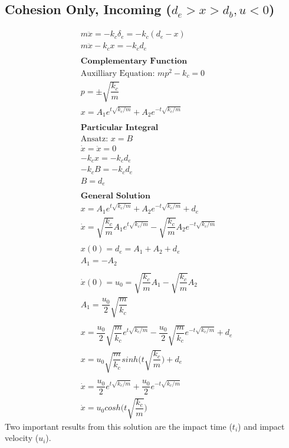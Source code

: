 \documentclass[10pt,a4paper,titlepage]{report}
\begin{document}
\subsection{Cohesion Only, Incoming ($d_e > x > d_b, u < 0$)}
\begin{align*}
&m \ddot{x} = - k_c \delta_e = - k_c (d_e - x) \\
&m \ddot{x} - k_c x = - k_c d_e \\\\
&\textbf{Complementary Function} \\
&\text{Auxilliary Equation: } mp^2 - k_c = 0 \\
&p = \pm \sqrt{\dfrac{k_c}{m}} \\ 
&x = A_1 e^{t \sqrt{k_c / m}} + A_2 e^{- t \sqrt{k_c / m}} \\\\
&\textbf{Particular Integral} \\
&\text{Ansatz: } x = B \\
&\dot{x} = \ddot{x} = 0 \\
&- k_c x = - k_c d_e  \\
&- k_c B = - k_c d_e \\
& B = d_e \\\\
&\textbf{General Solution} \\
&x = A_1 e^{t \sqrt{k_c / m}} + A_2 e^{- t \sqrt{k_c / m}} + d_e \\
&\dot{x} = \sqrt{\dfrac{k_c}{m}} A_1 e^{t \sqrt{k_c / m}} - \sqrt{\dfrac{k_c}{m}} A_2 e^{- t \sqrt{k_c / m}} \\\\
&x(0) = d_e = A_1 + A_2 + d_e \\
&A_1 = - A_2 \\\\
&\dot{x}(0) = u_0 = \sqrt{\dfrac{k_c}{m}} A_1 - \sqrt{\dfrac{k_c}{m}} A_2 \\
&A_1 = \dfrac{u_0}{2} \sqrt{\dfrac{m}{k_c}} \\\\
&x = \dfrac{u_0}{2} \sqrt{\dfrac{m}{k_c}} e^{t \sqrt{k_c / m}} - \dfrac{u_0}{2} \sqrt{\dfrac{m}{k_c}} e^{- t \sqrt{k_c / m}} + d_e \\
&x = u_0 \sqrt{\dfrac{m}{k_c}} sinh\Big(t\sqrt{\dfrac{k_c}{m}}\Big) + d_e \\\\
&\dot{x} = \dfrac{u_0}{2} e^{t \sqrt{k_c / m}} + \dfrac{u_0}{2} e^{- t \sqrt{k_c / m}} \\
&\dot{x} = u_0 cosh\Big(t\sqrt{\dfrac{k_c}{m}}\Big)
\end{align*}
Two important results from this solution are the impact time ($t_i$) and impact velocity ($u_i$).
\end{document}
